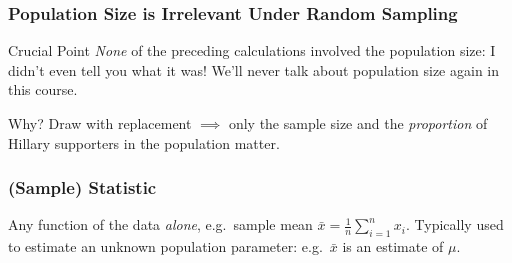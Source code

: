 \documentclass{beamer}
\begin{document}
\begin{frame}
  \frametitle{Population Size is Irrelevant Under Random Sampling}

  \begin{block}{Crucial Point}
    \emph{None} of the preceding calculations involved the population size: I didn't even tell you what it was!
    We'll never talk about population size again in this course.
  \end{block}

  \begin{block}{Why?}
    Draw with replacement $\implies$ only the sample size and the \emph{proportion} of Hillary supporters in the population matter.
  \end{block}

\end{frame}
\begin{frame}
  \frametitle{(Sample) Statistic}

  Any function of the data \emph{alone}, e.g.\ sample mean $\bar{x} = \frac{1}{n}\sum_{i=1}^n x_i$. Typically used to estimate an unknown population parameter: e.g.\ $\bar{x}$ is an estimate of $\mu$.

\end{frame}
\end{document}
